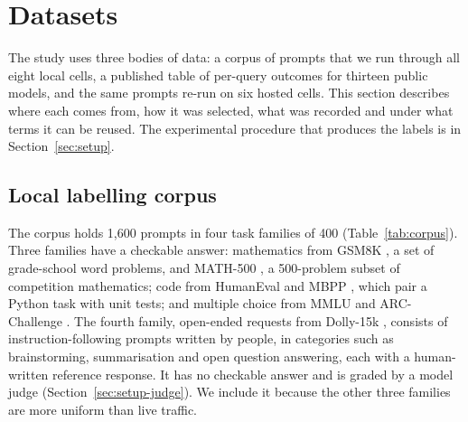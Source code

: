 \section{Datasets}
\label{sec:datasets}

The study uses three bodies of data: a corpus of prompts that we run through
all eight local cells, a published table of per-query outcomes for thirteen
public models, and the same prompts re-run on six hosted cells. This section
describes where each comes from, how it was selected, what was recorded and
under what terms it can be reused. The experimental procedure that produces
the labels is in Section~\ref{sec:setup}.

\subsection{Local labelling corpus}
\label{sec:data-corpus}

The corpus holds 1{,}600 prompts in four task families of 400
(Table~\ref{tab:corpus}). Three families have a checkable answer: mathematics
from GSM8K \cite{cobbe2021gsm8k}, a set of grade-school word problems, and
MATH-500 \cite{hendrycks2021math,lightman2024verify}, a 500-problem subset of
competition mathematics; code from HumanEval \cite{chen2021humaneval} and
MBPP \cite{austin2021mbpp}, which pair a Python task with unit tests; and
multiple choice from MMLU \cite{hendrycks2021mmlu} and ARC-Challenge
\cite{clark2018arc}. The fourth family, open-ended requests from Dolly-15k
\cite{conover2023dolly}, consists of instruction-following prompts written by
people, in categories such as brainstorming, summarisation and open
question answering, each with a human-written reference response. It has no
checkable answer and is graded by a model judge
(Section~\ref{sec:setup-judge}). We include it because the other three
families are more uniform than live traffic.

